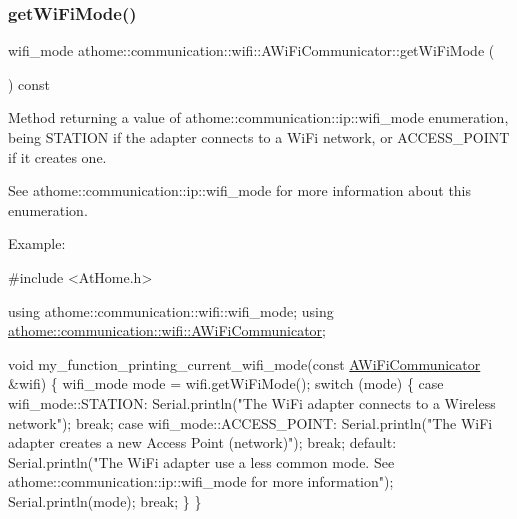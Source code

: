 \subsubsection{\texorpdfstring{get\+Wi\+Fi\+Mode()}{getWiFiMode()}}
{\footnotesize\ttfamily wifi\+\_\+mode athome\+::communication\+::wifi\+::\+A\+Wi\+Fi\+Communicator\+::get\+Wi\+Fi\+Mode (\begin{DoxyParamCaption}{ }\end{DoxyParamCaption}) const}

Method returning a value of athome\+::communication\+::ip\+::wifi\+\_\+mode enumeration, being S\+T\+A\+T\+I\+ON if the adapter connects to a Wi\+Fi network, or A\+C\+C\+E\+S\+S\+\_\+\+P\+O\+I\+NT if it creates one.

See athome\+::communication\+::ip\+::wifi\+\_\+mode for more information about this enumeration.

Example\+:


\begin{DoxyCode}
\textcolor{preprocessor}{#include <AtHome.h>}

\textcolor{keyword}{using} athome::communication::wifi::wifi\_mode;
\textcolor{keyword}{using} \mbox{\hyperlink{classathome_1_1communication_1_1wifi_1_1_a_wi_fi_communicator}{athome::communication::wifi::AWiFiCommunicator}};

\textcolor{keywordtype}{void} my\_function\_printing\_current\_wifi\_mode(\textcolor{keyword}{const} \mbox{\hyperlink{classathome_1_1communication_1_1wifi_1_1_a_wi_fi_communicator_a0098148fe8d0eeee99b7f8f72a72a900}{AWiFiCommunicator}} &wifi)
\{ wifi\_mode mode = wifi.getWiFiMode(); \textcolor{keywordflow}{switch} (mode) \{ \textcolor{keywordflow}{case}
wifi\_mode::STATION: Serial.println(\textcolor{stringliteral}{"The WiFi adapter connects to a Wireless}
\textcolor{stringliteral}{network"}); \textcolor{keywordflow}{break}; \textcolor{keywordflow}{case} wifi\_mode::ACCESS\_POINT: Serial.println(\textcolor{stringliteral}{"The WiFi}
\textcolor{stringliteral}{adapter creates a new Access Point (network)"}); \textcolor{keywordflow}{break}; \textcolor{keywordflow}{default}:
      Serial.println(\textcolor{stringliteral}{"The WiFi adapter use a less common mode. See}
\textcolor{stringliteral}{athome::communication::ip::wifi\_mode for more information"});
      Serial.println(mode);
      \textcolor{keywordflow}{break};
  \}
\}
\end{DoxyCode}
 \mbox{\label{classathome_1_1communication_1_1wifi_1_1_a_wi_fi_communicator_a578087d01c814481d89ea702a6d7ed01}} 
